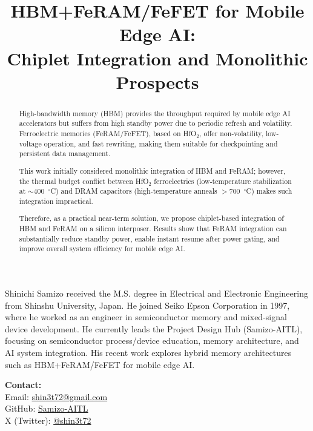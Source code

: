 \documentclass[10pt,conference]{IEEEtran}
\title{HBM+FeRAM/FeFET for Mobile Edge AI:\\
Chiplet Integration and Monolithic Prospects}
\author{%
  \IEEEauthorblockN{Shinichi Samizo}%
  \IEEEauthorblockA{Project Design Hub (Samizo-AITL), Japan\\
  Email: \href{mailto:shin3t72@gmail.com}{shin3t72@gmail.com}}%
}
\begin{document}
\maketitle

\begin{abstract}
High-bandwidth memory (HBM) provides the throughput required by mobile edge AI accelerators but suffers from high standby power due to periodic refresh and volatility.
Ferroelectric memories (FeRAM/FeFET), based on HfO$_2$, offer non-volatility, low-voltage operation, and fast rewriting, making them suitable for checkpointing and persistent data management.

This work initially considered monolithic integration of HBM and FeRAM; however, the thermal budget conflict between HfO$_2$ ferroelectrics (low-temperature stabilization at $\sim$400~$^\circ$C) and DRAM capacitors (high-temperature anneals $>$700~$^\circ$C) makes such integration impractical.

Therefore, as a practical near-term solution, we propose chiplet-based integration of HBM and FeRAM on a silicon interposer. Results show that FeRAM integration can substantially reduce standby power, enable instant resume after power gating, and improve overall system efficiency for mobile edge AI.
\end{abstract}







\nocite{ChoiIEDM2022,KimIEDM2021,MuellerIEDM2012,MartinVLSI2020,NohedaNature2023}

\IEEEtriggercmd{\columnbreak}





\begingroup\small
\vspace{0.25\baselineskip}
\begin{IEEEbiographynophoto}{Shinichi Samizo}
received the M.S. degree in Electrical and Electronic Engineering from Shinshu University, Japan.
He joined Seiko Epson Corporation in 1997, where he worked as an engineer in semiconductor memory and mixed-signal device development.
He currently leads the Project Design Hub (Samizo-AITL), focusing on semiconductor process/device education, memory architecture, and AI system integration.
His recent work explores hybrid memory architectures such as HBM+FeRAM/FeFET for mobile edge AI.

\textbf{Contact:}\\
Email: \href{mailto:shin3t72@gmail.com}{shin3t72@gmail.com}\\
GitHub: \href{https://github.com/Samizo-AITL}{Samizo-AITL}\\
X (Twitter): \href{https://x.com/shin3t72}{@shin3t72}
\end{IEEEbiographynophoto}
\endgroup
\end{document}
